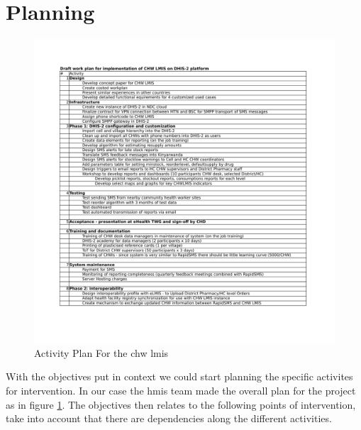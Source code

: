 \section{Planning}
\begin{figure}
\centering
\includegraphics[width=\textwidth]{case/img/lmisWorkPlan}
\caption{Activity Plan For the \gls{chw} \gls{lmis}}
\label{fig:activityPlan}
\end{figure}
With the objectives put in context we could start planning the specific activites for intervention. 
In our case the \gls{hmis} team made the overall plan for the project as in figure \ref{fig:activityPlan}.
The objectives then relates to the following points of intervention, take into account that there are dependencies along the different activities. 

